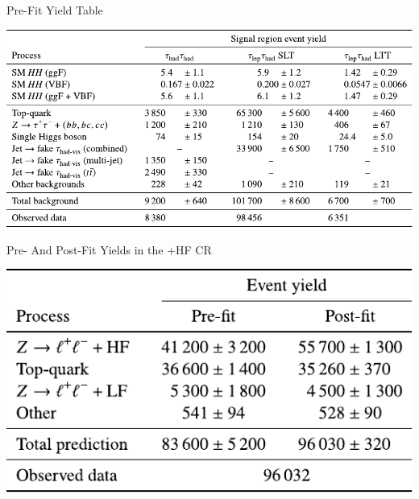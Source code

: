 \documentclass[11pt, xcolor={dvipsnames}, aspectratio=169, notes]{beamer}
\begin{document}

\begin{frame}{Pre-Fit Yield Table}
  \centering

  \includegraphics[scale=0.9]{yieldtable_prefit}
\end{frame}


\begin{frame}{Pre- And Post-Fit Yields in the +HF CR}
  \centering

  \includegraphics[scale=0.9]{backup/zhf_yields}
\end{frame}

\end{document}
